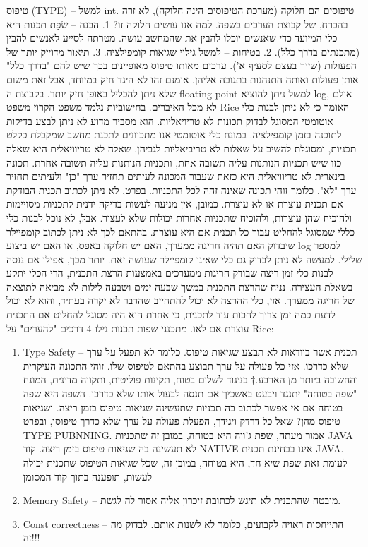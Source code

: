 \begin{טבלא}[!htbp]
      טיפוס (TYPE) – למשל int. טיפוסים הם חלוקה (מערכת הטיפוסים הינה חלוקה), לא זרה
      בהכרח, של קבוצת הערכים בשפה. למה אנו עושים חלוקה זו?
      1. הבנה – שְׂפַת תכנות היא כלי המיועד כדי שאנשים יוכלו להבין את שהמחשב עושה.
      מטרתה לסייע לאנשים להבין (מתכנתים בדרך כלל).
      2. בטיחות – למשל גילוי שגיאות קומפילציה.
      3. תיאור מדוייק יותר של הפעולות (שייך בעצם לסעיף א').
      ערכים מאותו טיפוס מאופיינים בכך שיש להם "בדרך כלל" אותן פעולות ואותה התנהגות
      בתגובה אליהן. אומנם זהו לא היגד חזק במיוחד, אבל זאת משום שלא ניתן להכליל באופן
      חזק יותר. בקבוצת ה-floating point למשל ניתן להוציא log, אולם לא מכל האיברים.
      בחישוביות נלמד משפט הקרוי משפט Rice האומר כי לא ניתן לבנות כלי אוטומטי המסוגל
      לבדוק תכונות לא טריויאליות. הוא מסביר מדוע לא ניתן לבצע בדיקות לתוכנה בזמן
      קומפילציה.
      במונח כלי אוטומטי אנו מתכוונים לתכנת מחשב שמקבלת כקלט תכניות, ומסוגלת להשיב על
      שאלות לא טריביאליות לגביהן. שאלה לא טריוויאלית היא שאלה כזו שיש תכניות הנותנות
      עליה תשובה אחת, ותכניות הנותנות עליה תשובה אחרת. תכונה בינארית לא טריוויאלית
      היא כזאת שעבור המכונה לעיתים תחזיר ערך "כן" ולעיתים תחזיר ערך "לא". כלומר זוהי
      תכונה שאינה זהה לכל התכניות. בפרט, לא ניתן לכתוב תכנית הבודקת אם תכנית עוצרת
      או לא עוצרת. כמובן, אין מניעה לעשות בדיקה ידנית לתכניות מסויימות ולהוכיח שהן
      עוצרות, ולהוכיח שתכניות אחרות יכולות שלא לעצור. אבל, לא נוכל לבנות כלי כללי
      שמסוגל להחליט עבור כל תכנית אם היא עוצרת. בהתאם לכך לא ניתן לכתוב קומפיילר
      שיבדוק האם תהיה חריגה ממערך, האם יש חלוקה באפס, או האם יש ביצוע log למספר
      שלילי. למעשה לא ניתן לבדוק גם כלי שאינו קומפיילר שעושה זאת. יותר מכך, אפילו אם
      ננסה לבנות כלי זמן ריצה שבודק חריגות ממערכים באמצעות הרצת התכנית, הרי הכלי יתקע
      בשאלת העצירה. נניח שהרצת התכנית במשך שבעה ימים ושבעה לילות לא מביאה לתוצאה של
      חריגה ממערך. אזי, כלי ההרצה לא יכול להתחייב שהדבר לא יקרה בעתיד, והוא לא יכול
      לדעת כמה זמן צריך לחכות עוד לתכנית, כי אחרת הוא היה מסוגל להחליט אם התכנית
      עוצרת אם לאו.
      מתכנני שפות תכנות גילו 4 דרכים "להערים" על Rice:
      \begin{enumerate}
          \item Type Safety – תכנית אשר בוודאות לא תבצע שגיאות טיפוס. כלומר לא תפעל על
      ערך שלא כדרכו. אזי כל פעולה על ערך תבוצע בהתאם לטיפוס שלו. זוהי התכונה
      העיקרית והחשובה ביותר מן הארבע.†{ בניגוד לשלום בטוח, תקינות פוליטית,
      ותקווה מדינית, המונח "שפה בטוחה" יתנגד ויבעט באשכיך אם תנסה לבעול אותו
    שלא כדרכו. השפה היא שפה בטוחה אם אי אפשר לכתוב בה תכניות שתעשינה שגיאות
  טיפוס בזמן ריצה. ושגיאות טיפוס מהן? שאל כל דרדק ויגידך, הפעלת פעולה על ערך
שלא כדרך טיפוסו, ובפרט TYPE PUBNNING. אמור מעתה, שפת ג'ווה היא בטוחה, במובן זה
שתכניות JAVA לא תעשינה בה שגיאות טיפוס בזמן ריצה. קוד NATIVE אינו בבחינת תכנית
JAVA. לעומת זאת שפת שיא חד, היא בטוחה, במובן זה, שכל שגיאות הטיפוס שתכנית יכולה
לעשות, תופענה בתוך קוד המסומן}
\item Memory Safety – מובטח שהתכנית לא תיגש לכתובת
זיכרון אליה אסור לה לגשת.
      \item Const correctness – התייחסות ראויה לקבועים, כלומר לא לשנות אותם. לבדוק מה זה!!!


\end{enumerate}
\end{טבלא}
